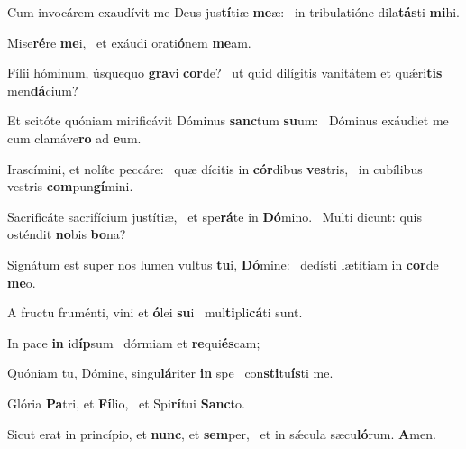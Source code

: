\item Cum invocárem exaudívit me Deus jus\textbf{tí}tiæ \textbf{me}æ:~\psstar{} in tribulatióne dila\textbf{tás}ti \textbf{mi}hi.
\item Mise\textbf{ré}re \textbf{me}i,~\psstar{} et exáudi orati\textbf{ó}nem \textbf{me}am.
\item Fílii hóminum, úsquequo \textbf{gra}vi \textbf{cor}de?~\psstar{} ut quid dilígitis vanitátem et quǽri\textbf{tis} men\textbf{dá}cium?
\item Et scitóte quóniam mirificávit Dóminus \textbf{sanc}tum \textbf{su}um:~\psstar{} Dóminus exáudiet me cum clamáve\textbf{ro} ad \textbf{e}um.
\item Irascímini, et nolíte peccáre:~\pscross{} quæ dícitis in \textbf{cór}dibus \textbf{ves}tris,~\psstar{} in cubílibus vestris \textbf{com}pun\textbf{gí}mini.
\item Sacrificáte sacrifícium justítiæ,~\pscross{} et spe\textbf{rá}te in \textbf{Dó}mino.~\psstar{} Multi dicunt: quis osténdit \textbf{no}bis \textbf{bo}na?
\item Signátum est super nos lumen vultus \textbf{tu}i, \textbf{Dó}mine:~\psstar{} dedísti lætítiam in \textbf{cor}de \textbf{me}o.
\item A fructu fruménti, vini et \textbf{ó}lei \textbf{su}i~\psstar{} mul\textbf{ti}pli\textbf{cá}ti sunt.
\item In pace \textbf{in} id\textbf{íp}sum~\psstar{} dórmiam et \textbf{re}qui\textbf{és}cam;
\item Quóniam tu, Dómine, singu\textbf{lá}riter \textbf{in} spe~\psstar{} con\textbf{sti}tu\textbf{ís}ti me.
\item Glória \textbf{Pa}tri, et \textbf{Fí}lio,~\psstar{} et Spi\textbf{rí}tui \textbf{Sanc}to.
\item Sicut erat in princípio, et \textbf{nunc}, et \textbf{sem}per,~\psstar{} et in sǽcula sæcu\textbf{ló}rum. \textbf{A}men.
